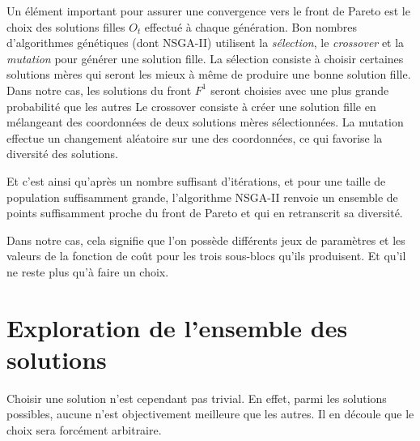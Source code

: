 Un élément important pour assurer une convergence vers le front de Pareto est le choix des solutions filles $O_t$ effectué à chaque génération.
Bon nombres d'algorithmes génétiques (dont NSGA-II) utilisent la \emph{sélection}, le \emph{crossover} et la \emph{mutation} pour générer une solution fille.
La sélection consiste à choisir certaines solutions mères qui seront les mieux à même de produire une bonne solution fille.
Dans notre cas, les solutions du front $F^1$ seront choisies avec une plus grande probabilité que les autres
Le crossover consiste à créer une solution fille en mélangeant des coordonnées de deux solutions mères sélectionnées.
La mutation effectue un changement aléatoire sur une des coordonnées, ce qui favorise la diversité des solutions.



Et c'est ainsi qu'après un nombre suffisant d'itérations, et pour une taille de population suffisamment grande, l'algorithme NSGA-II renvoie un ensemble de points suffisamment proche du front de Pareto et qui en retranscrit sa diversité.


Dans notre cas, cela signifie que l'on possède différents jeux de paramètres et les valeurs de la fonction de coût pour les trois sous-blocs qu'ils produisent.
Et qu'il ne reste plus qu'à faire un choix.



\section{Exploration de l'ensemble des solutions}


Choisir une solution n'est cependant pas trivial.
En effet, parmi les solutions possibles, aucune n'est objectivement meilleure que les autres.
Il en découle que le choix sera forcément arbitraire.


